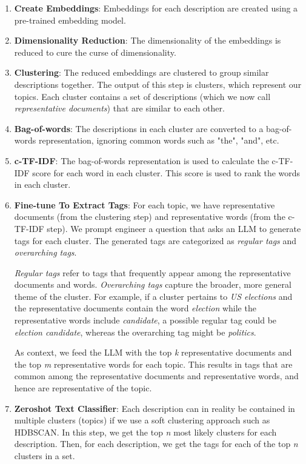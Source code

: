 \begin{enumerate}
    \item \textbf{Create Embeddings}: Embeddings for each description are created using a pre-trained embedding model.
    \item \textbf{Dimensionality Reduction}: The dimensionality of the embeddings is reduced to cure the curse of dimensionality.
    \item \textbf{Clustering}: The reduced embeddings are clustered to group similar descriptions together. The output of this step is clusters, which represent our topics. Each cluster contains a set of descriptions (which we now call \textit{representative documents}) that are similar to each other.
    \item \textbf{Bag-of-words}: The descriptions in each cluster are converted to a bag-of-words representation, ignoring common words such as "the", "and", etc.
    \item \textbf{c-TF-IDF}: The bag-of-words representation is used to calculate the c-TF-IDF score for each word in each cluster. This score is used to rank the words in each cluster.
    \item \textbf{Fine-tune To Extract Tags}: For each topic, we have representative documents (from the clustering step) and representative words (from the c-TF-IDF step). We prompt engineer a question that asks an LLM to generate tags for each cluster. The generated tags are categorized as \textit{regular tags} and \textit{overarching tags}.

    \textit{Regular tags} refer to tags that frequently appear among the representative documents and words. \textit{Overarching tags} capture the broader, more general theme of the cluster. For example, if a cluster pertains to \textit{US elections} and the representative documents contain the word \textit{election} while the representative words include \textit{candidate}, a possible regular tag could be \textit{election candidate}, whereas the overarching tag might be \textit{politics}.

    As context, we feed the LLM with the top \textit{k} representative documents and the top \textit{m} representative words for each topic. This results in tags that are common among the representative documents and representative words, and hence are representative of the topic.
    \item \textbf{Zeroshot Text Classifier}: Each description can in reality be contained in multiple clusters (topics) if we use a soft clustering approach such as HDBSCAN. In this step, we get the top \textit{n} most likely clusters for each description. Then, for each description, we get the tags for each of the top \textit{n} clusters in a set. 
    

\end{enumerate}
